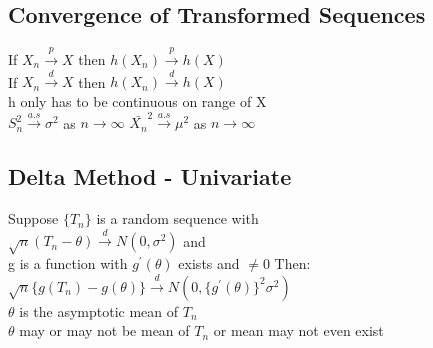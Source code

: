 \documentclass{article}
\newcommand{\cd}{\overset{d}{\to}}
\newcommand{\cp}{\overset{p}{\to}}
\newcommand{\sg}{\sigma}
\newcommand{\ta}{\theta}
\newcommand{\bxn}{\bar{X_n}}
\begin{document}
\begin{flushleft}
\section*{Convergence of Transformed Sequences}
If $X_n\cp X$ then $h(X_n)\cp h(X)$\\
If $X_n\cd X$ then $h(X_n)\cd h(X)$\\
h only has to be continuous on range of X\\
$S_n^2\overset{a.s}{\to} \sg^2$ as $n\to \infty$ \quad $\bxn^2\overset{a.s}{\to} \mu^2$ as $n\to \infty$
\subsection*{Delta Method - Univariate}
Suppose $\{T_n\}$ is a random sequence with\\
$\sqrt{n}(T_n-\ta)\cd N(0,\sg^2)$ and\\
g is a function with $g^{\prime}(\ta)$ exists and $\neq 0$ Then:\\
$\sqrt{n}\{g(T_n)-g(\ta)\}\cd N(0,\{g^{\prime}(\ta)\}^2\sg^2)$\\
$\ta$ is the asymptotic mean of $T_n$\\
$\ta$ may or may not be mean of $T_n$ or mean may not even exist
\end{flushleft}
\end{document}
